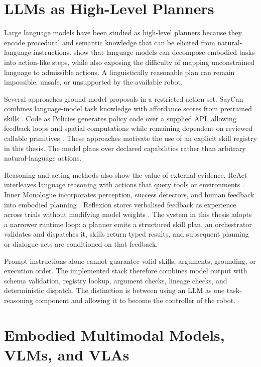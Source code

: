 \section{LLMs as High-Level Planners}

Large language models have been studied as high-level planners because they encode procedural and semantic knowledge that can be elicited from natural-language instructions. \textcite{huang2022zeroshot} show that language models can decompose embodied tasks into action-like steps, while also exposing the difficulty of mapping unconstrained language to admissible actions. A linguistically reasonable plan can remain impossible, unsafe, or unsupported by the available robot.

Several approaches ground model proposals in a restricted action set. SayCan combines language-model task knowledge with affordance scores from pretrained skills \parencite{ahn2022saycan}. Code as Policies generates policy code over a supplied API, allowing feedback loops and spatial computations while remaining dependent on reviewed callable primitives \parencite{liang2022codepolicies}. These approaches motivate the use of an explicit skill registry in this thesis. The model plans over declared capabilities rather than arbitrary natural-language actions.

Reasoning-and-acting methods also show the value of external evidence. ReAct interleaves language reasoning with actions that query tools or environments \parencite{yao2022react}. Inner Monologue incorporates perception, success detectors, and human feedback into embodied planning \parencite{huang2022innermonologue}. Reflexion stores verbalised feedback as experience across trials without modifying model weights \parencite{shinn2023reflexion}. The system in this thesis adopts a narrower runtime loop: a planner emits a structured skill plan, an orchestrator validates and dispatches it, skills return typed results, and subsequent planning or dialogue acts are conditioned on that feedback.

Prompt instructions alone cannot guarantee valid skills, arguments, grounding, or execution order. The implemented stack therefore combines model output with schema validation, registry lookup, argument checks, lineage checks, and deterministic dispatch. The distinction is between using an LLM as one task-reasoning component and allowing it to become the controller of the robot.

\section{Embodied Multimodal Models, VLMs, and VLAs}

